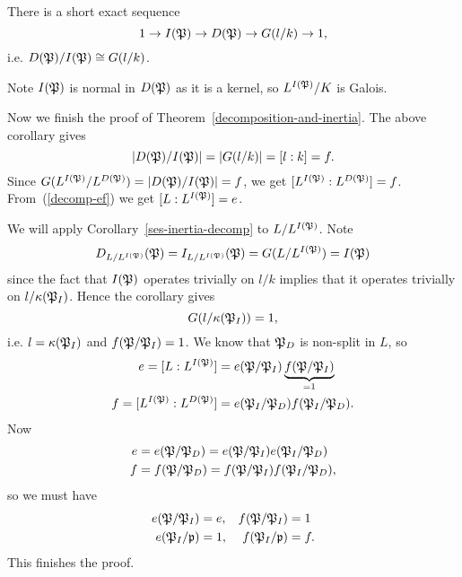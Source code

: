 \begin{cor}
There is a short exact sequence
\[
1\to I(\mathfrak{P})\to D(\mathfrak{P})\to G(l/k)\to 1,
\]
i.e. $D(\mathfrak{P})/I(\mathfrak{P})\cong G(l/k)$.
\end{cor}
Note $I(\mathfrak{P})$ is normal in $D(\mathfrak{P})$ as it is a kernel, so $L^{I(\mathfrak{P})}/K$ is Galois. 

Now we finish the proof of Theorem~\ref{decomposition-and-inertia}. The above corollary gives 
\[
|D(\mathfrak{P})/I(\mathfrak{P})|=|G(l/k)|=[l:k]=f.
\]
Since $G(L^{I(\mathfrak{P})}/L^{D(\mathfrak{P})})=|D(\mathfrak{P})/I(\mathfrak{P})|=f$, we get $[L^{I(\mathfrak{P})}:L^{D(\mathfrak{P})}]=f$. From~(\ref{decomp-ef}) we get $[L:L^{I(\mathfrak{P})}]=e$.

We will apply Corollary~\ref{ses-inertia-decomp} to $L/L^{I(\mathfrak{P})}$. Note
\[
D_{L/L^{I(\mathfrak{P})}}(\mathfrak{P})=I_{L/L^{I(\mathfrak{P})}}(\mathfrak{P})=G(L/L^{I(\mathfrak{P})})=I(\mathfrak{P})
\]
since the fact that $I(\mathfrak{P})$ operates trivially on $l/k$ implies that it operates trivially on $l/\kappa(\mathfrak{P}_I)$. Hence the corollary gives
\[
G(l/\kappa(\mathfrak{P}_I))=1,
\]
i.e. $l=\kappa(\mathfrak{P}_I)$ and $f(\mathfrak{P}/\mathfrak{P}_I)=1$. We know that $\mathfrak{P}_D$ is non-split in $L$, so 
\begin{align*}
e=[L:L^{I(\mathfrak{P})}]&=e(\mathfrak{P}/\mathfrak{P}_I)\underbrace{f(\mathfrak{P}/\mathfrak{P}_I)}_{=1}\\
f=[L^{I(\mathfrak{P})}:L^{D(\mathfrak{P})}]&=e(\mathfrak{P}_I/\mathfrak{P}_D)f(\mathfrak{P}_I/\mathfrak{P}_D).
\end{align*}
Now
\begin{align*}
e&=e(\mathfrak{P}/\mathfrak{P}_D)=e(\mathfrak{P}/\mathfrak{P}_I)e(\mathfrak{P}_I/\mathfrak{P}_D)\\
f&=f(\mathfrak{P}/\mathfrak{P}_D)=f(\mathfrak{P}/\mathfrak{P}_I)f(\mathfrak{P}_I/\mathfrak{P}_D),
\end{align*}
so we must have
\begin{align*}
e(\mathfrak{P}/\mathfrak{P}_I)&=e,&f(\mathfrak{P}/\mathfrak{P}_I)&=1\\
e(\mathfrak{P}_I/\mathfrak{p})&=1,&f(\mathfrak{P}_I/\mathfrak{p})&=f.
\end{align*}
This finishes the proof.
